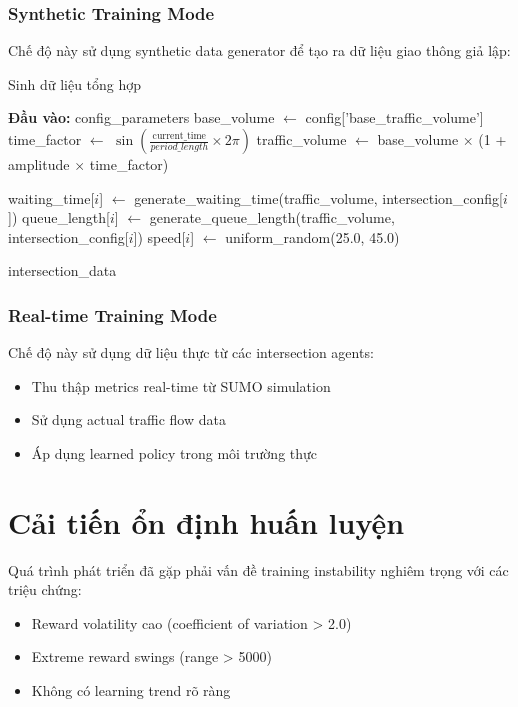 \subsubsection{Synthetic Training Mode}
Chế độ này sử dụng synthetic data generator để tạo ra dữ liệu giao thông giả lập:

\begin{algorithm}[!htp]
    \caption{Sinh dữ liệu tổng hợp}
    \begin{algorithmic}[1]
        \State \textbf{Đầu vào:} config\_parameters
        \State base\_volume $\leftarrow$ config['base\_traffic\_volume'] 
        \State time\_factor $\leftarrow$ $\sin(\frac{\text{current\_time}}{period\_length} \times 2\pi)$
        \State traffic\_volume $\leftarrow$ base\_volume $\times$ (1 + amplitude $\times$ time\_factor) 
        
            \State waiting\_time[$i$] $\leftarrow$ generate\_waiting\_time(traffic\_volume, intersection\_config[$i$])
            \State queue\_length[$i$] $\leftarrow$ generate\_queue\_length(traffic\_volume, intersection\_config[$i$])
            \State speed[$i$] $\leftarrow$ uniform\_random(25.0, 45.0) 
        \EndFor 
        
        \State \Return intersection\_data
    \end{algorithmic}
\end{algorithm}

\subsubsection{Real-time Training Mode}
Chế độ này sử dụng dữ liệu thực từ các intersection agents:
\begin{itemize}
    \item Thu thập metrics real-time từ SUMO simulation

    \item Sử dụng actual traffic flow data

    \item Áp dụng learned policy trong môi trường thực
\end{itemize}

\section{Cải tiến ổn định huấn luyện}

Quá trình phát triển đã gặp phải vấn đề training instability nghiêm trọng với các
triệu chứng:
\begin{itemize}
    \item Reward volatility cao (coefficient of variation > 2.0)

    \item Extreme reward swings (range > 5000)

    \item Không có learning trend rõ ràng
\end{itemize}

